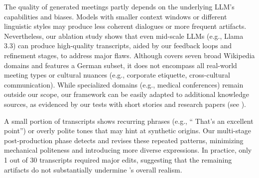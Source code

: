The quality of generated meetings partly depends on the underlying LLM's capabilities and biases.
Models with smaller context windows or different linguistic styles may produce less coherent dialogues or more frequent artifacts.
Nevertheless, our ablation study shows that even mid-scale LLMs (e.g., Llama 3.3) can produce high-quality transcripts, aided by our feedback loops and refinement stages, to address major flaws.
Although \dataset{} covers seven broad Wikipedia domains and features a German subset, it does not encompass all real-world meeting types or cultural nuances (e.g., corporate etiquette, cross-cultural communication).
While specialized domains (e.g., medical conferences) remain outside our scope, our framework can be easily adapted to additional knowledge sources, as evidenced by our tests with short stories and research papers (see ).

A small portion of transcripts shows recurring phrases (e.g., `` That's an excellent point'') or overly polite tones that may hint at synthetic origins.
Our multi-stage post-production phase detects and revises these repeated patterns, minimizing mechanical politeness and introducing more diverse expressions.
In practice, only 1 out of 30 transcripts required major edits, suggesting that the remaining artifacts do not substantially undermine \dataset{}’s overall realism.